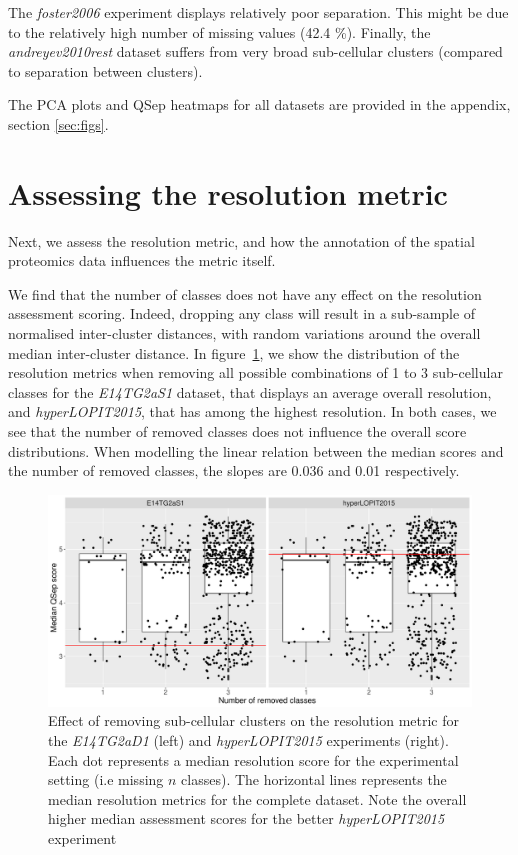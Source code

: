 \documentclass[12pt]{article}\usepackage[]{graphicx}\usepackage[]{color}
\begin{document}
The \textit{foster2006} experiment displays relatively poor
separation. This might be due to the relatively high number of missing
values (42.4 \%). Finally, the \textit{andreyev2010rest} dataset suffers from
very broad sub-cellular clusters (compared to separation between
clusters).


\bigskip

The PCA plots and QSep heatmaps for all datasets are provided in the
appendix, section \ref{sec:figs}.









\section{Assessing the resolution metric}\label{sec:qsepassess}

Next, we assess the resolution metric, and how the annotation of the
spatial proteomics data influences the metric itself.



We find that the number of classes does not have any effect on the
resolution assessment scoring. Indeed, dropping any class will result
in a sub-sample of normalised inter-cluster distances, with random
variations around the overall median inter-cluster distance. In
figure~\ref{fig:simn}, we show the distribution of the resolution
metrics when removing all possible combinations of 1 to 3 sub-cellular
classes for the \textit{E14TG2aS1} dataset, that displays an average
overall resolution, and \textit{hyperLOPIT2015}, that has among the
highest resolution. In both cases, we see that the number of removed
classes does not influence the overall score distributions. When
modelling the linear relation between the median scores and the number
of removed classes, the slopes are 0.036 and
0.01 respectively.

\begin{figure}[h]
  \centering
  \includegraphics[width = .7\textwidth]{simn.pdf}
  \caption{Effect of removing sub-cellular clusters on the resolution
    metric for the \textit{E14TG2aD1} (left) and
    \textit{hyperLOPIT2015} experiments (right). Each dot represents a
    median resolution score for the experimental setting (i.e missing
    $n$ classes). The horizontal lines represents the median resolution
    metrics for the complete dataset. Note the overall higher median
    assessment scores for the better \textit{hyperLOPIT2015}
    experiment }
  \label{fig:simn}
\end{figure}
\end{document}
